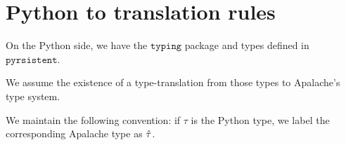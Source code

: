 \section{Python to \tlap{} translation rules}

On the Python side, we have the $\texttt{typing}$ package and types defined in $\texttt{pyrsistent}$. 

We assume the existence of a type-translation from those types to Apalache's type system.

We maintain the following convention: if $\tau$ is the Python type, we label the corresponding Apalache type as $\hat{\tau}$.

% 

